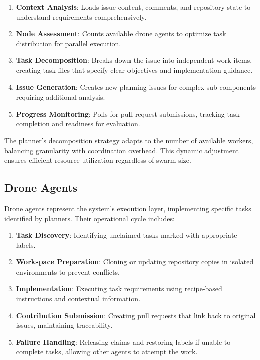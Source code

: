 \documentclass[11pt,a4paper]{article}
\begin{document}
\begin{enumerate}
    \item \textbf{Context Analysis}: Loads issue content, comments, and repository state to understand requirements comprehensively.
    
    \item \textbf{Node Assessment}: Counts available drone agents to optimize task distribution for parallel execution.
    
    \item \textbf{Task Decomposition}: Breaks down the issue into independent work items, creating task files that specify clear objectives and implementation guidance.
    
    \item \textbf{Issue Generation}: Creates new planning issues for complex sub-components requiring additional analysis.
    
    \item \textbf{Progress Monitoring}: Polls for pull request submissions, tracking task completion and readiness for evaluation.
\end{enumerate}

The planner's decomposition strategy adapts to the number of available workers, balancing granularity with coordination overhead. This dynamic adjustment ensures efficient resource utilization regardless of swarm size.

\subsection{Drone Agents}

Drone agents represent the system's execution layer, implementing specific tasks identified by planners. Their operational cycle includes:

\begin{enumerate}
    \item \textbf{Task Discovery}: Identifying unclaimed tasks marked with appropriate labels.
    
    \item \textbf{Workspace Preparation}: Cloning or updating repository copies in isolated environments to prevent conflicts.
    
    \item \textbf{Implementation}: Executing task requirements using recipe-based instructions and contextual information.
    
    \item \textbf{Contribution Submission}: Creating pull requests that link back to original issues, maintaining traceability.
    
    \item \textbf{Failure Handling}: Releasing claims and restoring labels if unable to complete tasks, allowing other agents to attempt the work.
\end{enumerate}
\end{document}
